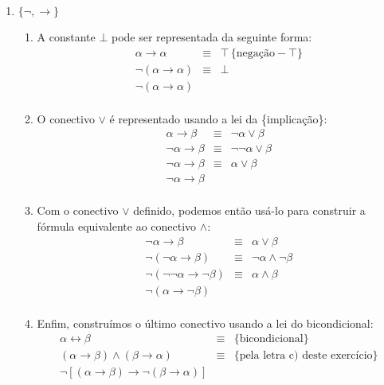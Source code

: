 \begin{enumerate}
	\item $\{\neg,\to\}$
		\begin{enumerate}
			\item A constante $\bot$ pode ser representada da seguinte forma:
				\[
					\begin{array}{lcl}
						\alpha \to \alpha & \equiv & \top \, \{\text{nega\c{c}\~ao}-\top\}\\
						\neg(\alpha \to \alpha)  & \equiv & \bot \\
						\neg(\alpha \to \alpha)  & & \\
					\end{array}
				\]
			\item O conectivo $\lor$ \'e representado usando a lei da \{implica\c{c}\~ao\}:
				\[
					\begin{array}{lcl}
						\alpha \to \beta & \equiv & \neg \alpha \lor \beta \\
						\neg \alpha \to \beta & \equiv & \neg \neg \alpha \lor \beta\\
						\neg \alpha \to \beta & \equiv & \alpha \lor \beta \\
						\neg \alpha \to \beta  &  & \\
					\end{array}
				\]
			\item Com o conectivo $\lor$ definido, podemos ent\~ao us\'a-lo para construir a f\'ormula equivalente ao conectivo $\land$:
				\[
					\begin{array}{lcl}
						\neg \alpha \to \beta & \equiv & \alpha \lor \beta \\
						\neg(\neg \alpha \to \beta) & \equiv & \neg \alpha \land \neg \beta \\
						\neg(\neg \neg \alpha \to \neg \beta) & \equiv & \alpha \land \beta \\
						\neg( \alpha \to \neg \beta) & & \\
					\end{array}
				\]
			\item Enfim, constru\'imos o \'ultimo conectivo usando a lei do bicondicional:
			\[
				\begin{array}{lcl}
					\alpha \leftrightarrow \beta & \equiv & \{\text{bicondicional}\} \\
					(\alpha \to \beta) \land (\beta \to \alpha) & \equiv & \{\text{pela letra c) deste exerc\'icio}\}\\
					\neg[(\alpha \to \beta) \to \neg(\beta \to \alpha) ] & & \\
				\end{array}
			\]
			 

\end{enumerate}
\end{enumerate}
